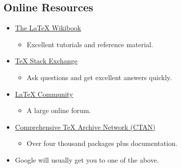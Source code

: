 \documentclass{beamer}
\begin{document}
\subsection*{Online Resources}
\begin{frame}{\insertsubsection}
\begin{itemize}
\item \href{http://en.wikibooks.org/wiki/LaTeX}{The \LaTeX{} Wikibook} 
\begin{itemize}
  \item Excellent tutorials and reference material.
\end{itemize}
\item \href{http://tex.stackexchange.com/}{\TeX{} Stack Exchange} 
\begin{itemize}
  \item Ask questions and get excellent answers quickly.
\end{itemize}
\item \href{http://www.latex-community.org/}{\LaTeX{} Community}
\begin{itemize}
  \item A large online forum.
\end{itemize}
\item \href{http://ctan.org/}{Comprehensive \TeX{} Archive Network (CTAN)} 
\begin{itemize}
  \item Over four thousand packages plus documentation.
\end{itemize}
\item Google will usually get you to one of the above.
\end{itemize}
\end{frame}
\end{document}
